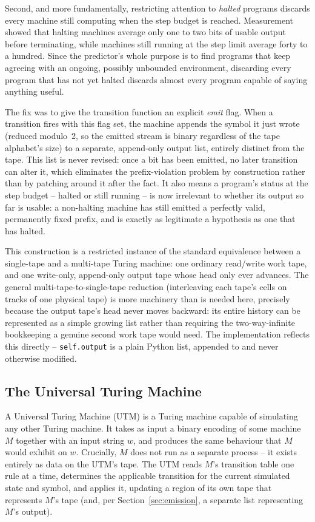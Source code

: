 \documentclass[11pt]{article}
\begin{document}
Second, and more fundamentally, restricting attention to \emph{halted} programs discards
every machine still computing when the step budget is reached. Measurement showed that
halting machines average only one to two bits of usable output before terminating, while
machines still running at the step limit average forty to a hundred. Since the predictor's
whole purpose is to find programs that keep agreeing with an ongoing, possibly unbounded
environment, discarding every program that has not yet halted discards almost every program
capable of saying anything useful.

The fix was to give the transition function an explicit \emph{emit} flag. When a transition
fires with this flag set, the machine appends the symbol it just wrote (reduced modulo~2, so
the emitted stream is binary regardless of the tape alphabet's size) to a separate,
append-only output list, entirely distinct from the tape. This list is never revised: once a
bit has been emitted, no later transition can alter it, which eliminates the prefix-violation
problem by construction rather than by patching around it after the fact. It also means a
program's status at the step budget -- halted or still running -- is now irrelevant to
whether its output so far is usable: a non-halting machine has still emitted a perfectly
valid, permanently fixed prefix, and is exactly as legitimate a hypothesis as one that has
halted.

This construction is a restricted instance of the standard equivalence between a
single-tape and a multi-tape Turing machine: one ordinary read/write work tape, and one
write-only, append-only output tape whose head only ever advances. The general
multi-tape-to-single-tape reduction (interleaving each tape's cells on tracks of one
physical tape) is more machinery than is needed here, precisely because the output tape's
head never moves backward: its entire history can be represented as a simple growing list
rather than requiring the two-way-infinite bookkeeping a genuine second work tape would
need. The implementation reflects this directly -- \texttt{self.output} is a plain Python
list, appended to and never otherwise modified.

\subsection{The Universal Turing Machine}
\label{sec:utm}

A Universal Turing Machine (UTM) is a Turing machine capable of simulating any other
Turing machine. It takes as input a binary encoding of some machine $M$ together with an
input string $w$, and produces the same behaviour that $M$ would exhibit on $w$. Crucially,
$M$ does not run as a separate process -- it exists entirely as data on the UTM's tape.
The UTM reads $M$'s transition table one rule at a time, determines the applicable
transition for the current simulated state and symbol, and applies it, updating a region
of its own tape that represents $M$'s tape (and, per Section~\ref{sec:emission}, a separate
list representing $M$'s output).
\end{document}
